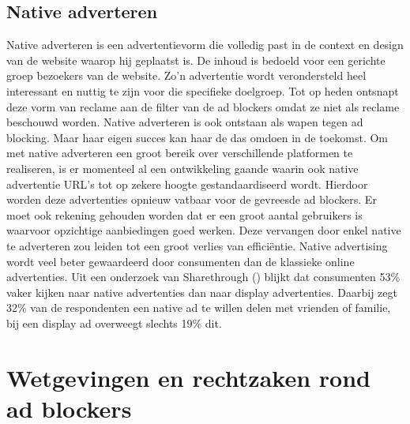 \documentclass[pdftex,a4paper,12pt,twoside]{report}
\begin{document}
\section{Native adverteren}
\label{sec Native adverteren}
Native adverteren is een advertentievorm die volledig past in de context en design van de website waarop hij geplaatst is. De inhoud is bedoeld voor een gerichte groep bezoekers van de website. Zo’n advertentie wordt verondersteld heel interessant en nuttig te zijn voor die specifieke doelgroep. Tot op heden ontsnapt deze vorm van reclame aan de filter van de ad blockers omdat ze niet als reclame beschouwd worden. Native adverteren is ook ontstaan als wapen tegen ad blocking. Maar haar eigen succes kan haar de das omdoen in de toekomst. Om met native adverteren een groot bereik over verschillende platformen te realiseren, is er momenteel al een ontwikkeling gaande waarin ook native advertentie URL's tot op zekere hoogte gestandaardiseerd wordt. Hierdoor worden deze advertenties opnieuw vatbaar voor de gevreesde ad blockers. Er moet ook rekening gehouden worden dat er een groot aantal gebruikers is waarvoor opzichtige aanbiedingen goed werken. Deze vervangen door enkel native te adverteren zou leiden tot een groot verlies van efficiëntie.
Native advertising wordt veel beter gewaardeerd door consumenten dan de klassieke online advertenties. Uit een onderzoek van Sharethrough (\cite{ShareThrough2013}) blijkt dat consumenten 53\% vaker kijken naar native advertenties dan naar display advertenties. Daarbij zegt 32\% van de respondenten een native ad te willen delen met vrienden of familie, bij een display ad overweegt slechts 19\% dit.


\chapter{Wetgevingen en rechtzaken rond ad blockers}
\label{ch: Wetgevingen en rechtzaken rond ad blockers}
\end{document}

